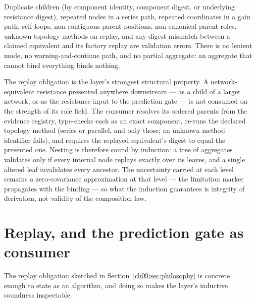 \begin{ruleenv}\label{ch09:rule:failclosed}
Duplicate children (by component identity, component digest, or underlying
resistance digest), repeated nodes in a series path, repeated coordinates
in a gain path, self-loops, non-contiguous parent positions, non-canonical
parent roles, unknown topology methods on replay, and any digest mismatch
between a claimed equivalent and its factory replay are validation errors.
There is no lenient mode, no warning-and-continue path, and no partial
aggregate: an aggregate that cannot bind everything binds nothing.
\end{ruleenv}

The replay obligation is the layer's
strongest structural property. A network-equivalent resistance presented
anywhere downstream --- as a child of a larger network, or as the
resistance input to the prediction gate --- is not consumed on the
strength of its role field. The consumer resolves its ordered parents from
the evidence registry, type-checks each as an exact component, re-runs the
declared topology method (series or parallel, and only those; an unknown
method identifier fails), and requires the replayed equivalent's digest to
equal the presented one. Nesting is therefore sound by induction: a tree
of aggregates validates only if every internal node replays exactly over
its leaves, and a single altered leaf invalidates every ancestor. The
uncertainty carried at each level remains a zero-covariance approximation
at that level --- the limitation marker propagates with the binding ---
so what the induction guarantees is integrity of derivation, not validity
of the composition law.

\section{Replay, and the prediction gate as consumer}\label{ch09:sec:replay}

The replay obligation sketched in Section~\ref{ch09:sec:philosophy} is
concrete enough to state as an algorithm, and doing so makes the layer's
inductive soundness inspectable.

